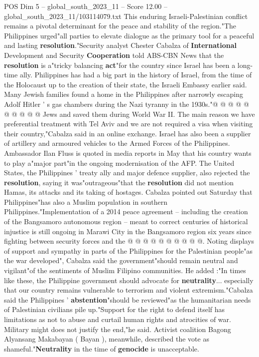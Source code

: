 \begin{textsample}{POS Dim 5 – global\_south\_2023\_11 – Score 12.00 – global\_south\_2023\_11/103114079.txt}
This enduring Israeli-Palestinian conflict remains a pivotal determinant for the peace and stability of the region."The Philippines urged"all parties to elevate dialogue as the primary tool for a peaceful and lasting \textbf{resolution}."Security analyst Chester Cabalza of \textbf{International} Development and Security \textbf{Cooperation} told ABS-CBN News that the \textbf{resolution} is a"tricky balancing \textbf{act}"for the country since Israel has been a long-time ally.
Philippines has had a big part in the history of Israel, from the time of the Holocaust up to the creation of their state, the Israeli Embassy earlier said.
Many Jewish families found a home in the Philippines after narrowly escaping Adolf Hitler ' s gas chambers during the Nazi tyranny in the 1930s."@ @ @ @ @ @ @ @ @ @ Jews and saved them during World War II.
The main reason we have preferential treatment with Tel Aviv and we are not required a visa when visiting their country,"Cabalza said in an online exchange.
Israel has also been a supplier of artillery and armoured vehicles to the Armed Forces of the Philippines.
Ambassador Ilan Fluss is quoted in media reports in May that his country wants to play a"major part"in the ongoing modernisation of the AFP.
The United States, the Philippines ' treaty ally and major defence supplier, also rejected the \textbf{resolution}, saying it was"outrageous"that the \textbf{resolution} did not mention Hamas, its attacks and its taking of hostages.
Cabalza pointed out Saturday that Philippines"has also a Muslim population in southern Philippines."Implementation of a 2014 peace agreement -- including the creation of the Bangsamoro autonomous region -- meant to correct centuries of historical injustice is still ongoing in Marawi City in the Bangsamoro region six years since fighting between security forces and the @ @ @ @ @ @ @ @ @ @.
Noting displays of support and sympathy in parts of the Philippines for the Palestinian people"as the war developed", Cabalza said the government"should remain neutral and vigilant"of the sentiments of Muslim Filipino communities.
He added :"In times like these, the Philippine government should advocate for \textbf{neutrality}... especially that our country remains vulnerable to terrorism and violent extremism."Cabalza said the Philippines ' \textbf{abstention}"should be reviewed"as the humanitarian needs of Palestinian civilians pile up."Support for the right to defend itself has limitations as not to abuse and curtail human rights and atrocities of war.
Military might does not justify the end,"he said.
Activist coalition Bagong Alyansang Makabayan ( Bayan ), meanwhile, described the vote as shameful."\textbf{Neutrality} in the time of \textbf{genocide} is unacceptable.

\end{textsample}
